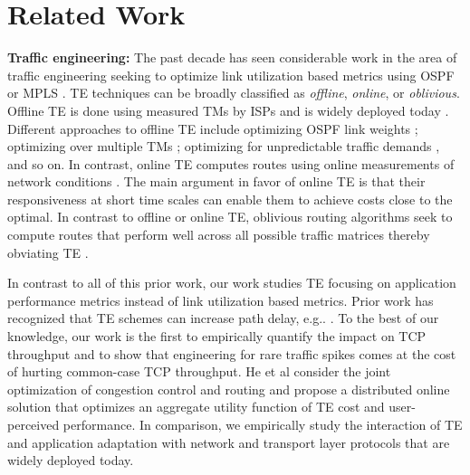 
\section{Related Work}
\label{sec:rel}

\noindent\textbf{Traffic engineering:}
The past decade has seen considerable work in the area of traffic engineering seeking to optimize link utilization based metrics using OSPF \cite{fortz2000internet} or MPLS \cite{MPLSIntro}.  TE techniques can be broadly classified as {\em offline}, {\em online}, or {\em oblivious}. Offline TE is done using measured TMs by ISPs and is widely deployed today \cite{rexford}. Different approaches to offline TE include optimizing OSPF link weights \cite{fortz2000internet}; optimizing over multiple TMs \cite{MultiTM};  optimizing  for unpredictable traffic demands \cite{COPE}, and so on. In contrast, online TE  computes routes using online measurements of network conditions \cite{MPLS2,COPE}. The main argument in favor of online TE is that their responsiveness at short time scales can enable them to achieve costs close to the optimal. In contrast to offline or online TE, oblivious routing algorithms seek to compute routes that perform well across all possible traffic matrices thereby obviating TE \cite{Cohen}. 

In contrast to all of this prior work, our work studies TE focusing on application performance metrics instead of link utilization based metrics.
Prior work has recognized that TE schemes can increase path delay, e.g.. \cite{TEXCP}.  To the best of our knowledge, our work is the first to empirically quantify the impact on TCP throughput and to show that engineering for rare traffic spikes comes at the cost of hurting common-case TCP throughput. He et al \cite{JointCCR2} consider the joint optimization of congestion control and routing and propose a distributed online solution that optimizes an aggregate utility function of TE cost and user-perceived performance. In comparison, we empirically study the interaction of TE and application adaptation with network and transport layer protocols that are widely deployed today.



